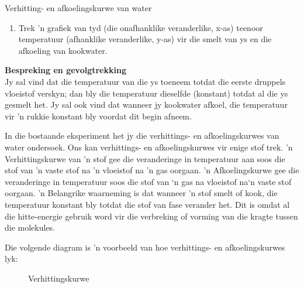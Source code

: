 \begin{f_experiment}{Verhitting- en afkoelingskurwe van water}
{\begin{enumerate}[noitemsep, label=\textbf{\arabic*}.]
\begin{table}[H]
\begin{center}
\begin{tabular}{|l|l|l|l|}
    \end{tabular}
      \end{center}
\end{table}
\item Trek 'n grafiek van tyd (die onafhanklike veranderlike, x-as) teenoor temperatuur (afhanklike veranderlike, y-as) vir die smelt van ys en die afkoeling van kookwater.
\end{enumerate}
\par   
\label{m38736*eip-864}\noindent{}\textbf{Bespreking en gevolgtrekking}\\
Jy sal vind dat die temperatuur van die ys toeneem totdat die eerste druppels vloeistof
verskyn; dan bly die temperatuur dieselfde (konstant) totdat al die ys gesmelt het. Jy sal ook
vind dat wanneer jy kookwater afkoel, die temperatuur vir 'n rukkie konstant bly voordat dit
begin afneem.}
\end{f_experiment} 
\par \label{m38736*eip-25}In die bostaande eksperiment het jy die verhittings- en afkoelingskurwes van water ondersoek. Ons kan
verhittings- en afkoelingskurwes vir enige stof trek. 'n Verhittingskurwe van 'n stof gee die veranderinge
in temperatuur aan soos die stof van 'n vaste stof na 'n vloeistof na 'n gas oorgaan. 'n Afkoelingskurwe gee
die veranderinge in temperatuur soos die stof van ‘n gas na vloeistof na‘n vaste stof oorgaan. 'n Belangrike
waarneming is dat wanneer 'n stof smelt of kook, die temperatuur konstant bly totdat die stof van fase verander
het. Dit is omdat al die hitte-energie gebruik word vir die verbreking of vorming van die kragte tussen die molekules.  \par 
Die volgende diagram is 'n voorbeeld van hoe verhittings- en afkoelingskurwes lyk: \par
\begin{minipage}{0.5\textwidth}
\begin{figure}[H]
 \begin{center}
\end{center}
\caption{Verhittingskurwe}
\end{figure}
\end{minipage}
